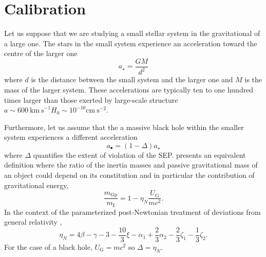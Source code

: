 \documentclass[useAMS,usenatbib]{mn2e}
\begin{document}
\section{Calibration}

Let us suppose that we are studying a small stellar system in the
gravitational of a large one.  The stars in the small system
experience an acceleration toward the centre of the larger one
\begin{equation}
  a_\star = \frac{GM}{d^2}
  \label{eq:1}
\end{equation}
where $d$ is the distance between the small system and the larger one
and $M$ is the mass of the larger system.  These accelerations are
typically ten to one hundred times larger than those exerted by
large-scale structure $a \sim 600~\mathrm{km~s}^{-1} H_0 \sim 10^{-10}
\mathrm{cm~s}^{-2}$.

Furthermore, let us assume that the a massive black hole within the
smaller system experiences a different acceleration
\begin{equation}
  a_\bullet = \left ( 1 - \Delta \right ) a_\star
  \label{eq:2}
\end{equation}
where $\Delta$ quantifies the extent of violation of the
SEP. \citet{1982RPPh...45..631N} presents an equivalent definition
where the ratio of the inertia masses and passive gravitational mass
of an object could depend on its constitution and in particular the
contribution of gravitational energy,
\begin{equation}
  \frac{m_\mathrm{Gp}}{m_\mathrm{I}} = 1- \eta_N \frac{U_\mathrm{G}}{mc^2}.
  \label{eq:14}
\end{equation}
In the context of the parameterized post-Newtonian treatment of
deviations from general relativity \citep{Will:lrr},
\begin{equation}
  \eta_{N} =4\beta−\gamma − 3− \frac{10}{3} \xi - \alpha_1 +
  \frac{2}{3} \alpha_2 - \frac{2}{3} \zeta_1 - \frac{1}{3} \zeta_2.
\end{equation}
For the case of a black hole, $U_\mathrm{G} = mc^2$ so
$\Delta=\eta_N$. 
\end{document}
